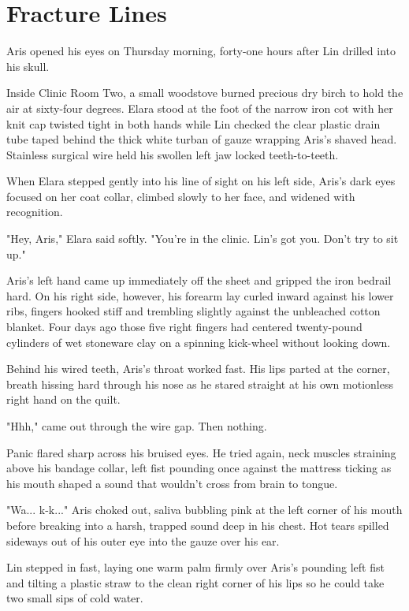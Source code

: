 \chapter{Fracture Lines}

Aris opened his eyes on Thursday morning, forty-one hours after Lin drilled into his skull.

Inside Clinic Room Two, a small woodstove burned precious dry birch to hold the air at sixty-four degrees. Elara stood at the foot of the narrow iron cot with her knit cap twisted tight in both hands while Lin checked the clear plastic drain tube taped behind the thick white turban of gauze wrapping Aris's shaved head. Stainless surgical wire held his swollen left jaw locked teeth-to-teeth.

When Elara stepped gently into his line of sight on his left side, Aris's dark eyes focused on her coat collar, climbed slowly to her face, and widened with recognition.

"Hey, Aris," Elara said softly. "You're in the clinic. Lin's got you. Don't try to sit up."

Aris's left hand came up immediately off the sheet and gripped the iron bedrail hard. On his right side, however, his forearm lay curled inward against his lower ribs, fingers hooked stiff and trembling slightly against the unbleached cotton blanket. Four days ago those five right fingers had centered twenty-pound cylinders of wet stoneware clay on a spinning kick-wheel without looking down.

Behind his wired teeth, Aris's throat worked fast. His lips parted at the corner, breath hissing hard through his nose as he stared straight at his own motionless right hand on the quilt.

"Hhh," came out through the wire gap. Then nothing.

Panic flared sharp across his bruised eyes. He tried again, neck muscles straining above his bandage collar, left fist pounding once against the mattress ticking as his mouth shaped a sound that wouldn't cross from brain to tongue.

"Wa... k-k..." Aris choked out, saliva bubbling pink at the left corner of his mouth before breaking into a harsh, trapped sound deep in his chest. Hot tears spilled sideways out of his outer eye into the gauze over his ear.

Lin stepped in fast, laying one warm palm firmly over Aris's pounding left fist and tilting a plastic straw to the clean right corner of his lips so he could take two small sips of cold water.

